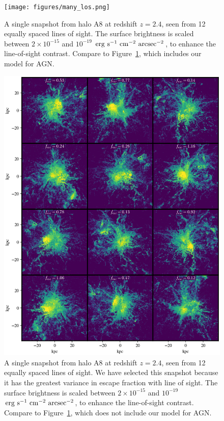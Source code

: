 \begin{figure}
    \centering
    \texttt{[image: figures/many\_los.png]}
    \caption{
        A single snapshot from halo A8 at redshift $z=2.4$, seen from 12 equally spaced lines of sight.
        The surface brightness is scaled between $2\times10^{-15}$ and $10^{-19}$ $\rm{erg}\ \rm{s}^{-1}\ \rm{cm}^{-2}\ \rm{arcsec}^{-2}$, to enhance the line-of-sight contrast.
        Compare to Figure~\ref{fig:many_los}, which includes our model for AGN.
    }
    \label{fig:many_los}
\end{figure}

\begin{figure}
    \centering
    \includegraphics[width=\textwidth,height=0.9\textheight,keepaspectratio]{figures/agn_many_los.png}
    \caption{
        A single snapshot from halo A8 at redshift $z=2.4$, seen from 12 equally spaced lines of sight.
        We have selected this snapshot because it has the greatest variance in escape fraction with line of sight.
        The surface brightness is scaled between $2\times10^{-15}$ and $10^{-19}$ $\rm{erg}\ \rm{s}^{-1}\ \rm{cm}^{-2}\ \rm{arcsec}^{-2}$, to enhance the line-of-sight contrast.
        Compare to Figure~\ref{fig:many_los}, which does not include our model for AGN.
    }
    \label{fig:agn_many_los}
\end{figure}


